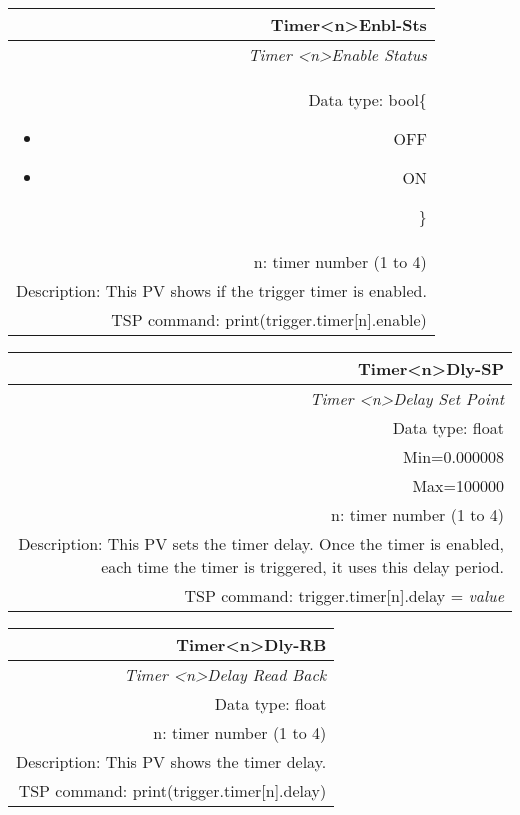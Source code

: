 \documentclass[openany]{article}
\begin{document}
		\begin{tabular}{N}
			\hline
			\bfseries Timer{\textless n\textgreater}Enbl-Sts\label{pv:timerenbl-sts} \\ \hline
			\emph{Timer \textless n\textgreater Enable Status} \\
			Data type: bool\{\begin{itemize}[noitemsep]
				\small
				\item[] OFF
				\item[] ON
			\end{itemize}\} \\
			n: timer number (1 to 4) \\
			Description: This PV shows if the trigger timer is enabled. \\
			TSP command: print(trigger.timer[n].enable)
		\end{tabular}

		\begin{tabular}{N}
			\hline
			\bfseries Timer{\textless n\textgreater}Dly-SP\label{pv:timerdly-sp} \\ \hline
			\emph{Timer \textless n\textgreater Delay Set Point} \\
			Data type: float \\
			Min=0.000008 \\
			Max=100000 \\
			n: timer number (1 to 4) \\
			Description: This PV sets the timer delay. Once the timer is enabled, each time the timer is triggered, it uses this delay period. \\
			TSP command: trigger.timer[n].delay = \emph{value}
		\end{tabular}

		\begin{tabular}{N}
			\hline
			\bfseries Timer{\textless n\textgreater}Dly-RB\label{pv:timerdly-rb} \\ \hline
			\emph{Timer \textless n\textgreater Delay Read Back} \\
			Data type: float \\
			n: timer number (1 to 4) \\
			Description: This PV shows the timer delay. \\
			TSP command: print(trigger.timer[n].delay)
		\end{tabular}
\end{document}
